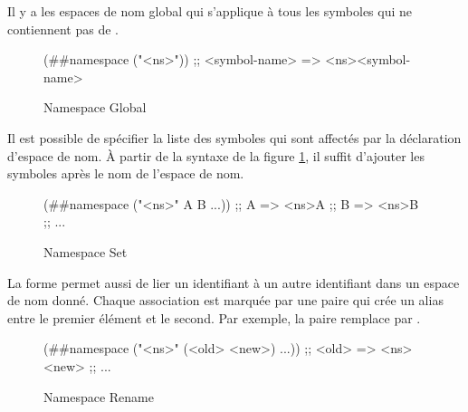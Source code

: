 Il y a les espaces de nom global qui s'applique à tous les symboles qui ne
contiennent pas de \lstcode{#}. \\
\begin{figure}[ht]
  \centering
  \begin{mplisting}{0.6}
(##namespace ("<ns>"))
;; <symbol-name> => <ns><symbol-name>
\end{mplisting}
  \caption{Namespace Global}
  \label{fig:forms->namespace-global}
\end{figure}

Il est possible de spécifier la liste des symboles qui sont affectés par la
déclaration d'espace de nom. À partir de la syntaxe de la figure
\ref{fig:forms->namespace-global}, il suffit d'ajouter les symboles après le nom
de l'espace de nom.\\
\begin{figure}[ht]
  \centering
  \begin{mplisting}{0.6}
(##namespace ("<ns>" A B ...))
;; A => <ns>A
;; B => <ns>B
;; ...
\end{mplisting}
  \caption{Namespace Set}
  \label{fig:forms->namespace-set}
\end{figure}

La forme  permet aussi de lier un identifiant à un
autre identifiant dans un espace de nom donné. Chaque association est marquée
par une paire qui crée un alias entre le premier élément et le second. Par exemple,
la paire  remplace  par .\\
\begin{figure}[ht]
  \centering
  \begin{mplisting}{0.6}
(##namespace ("<ns>" (<old> <new>) ...))
;; <old> => <ns><new>
;; ...
\end{mplisting}
  \caption{Namespace Rename}
  \label{fig:forms->namespace-rename}
\end{figure}



